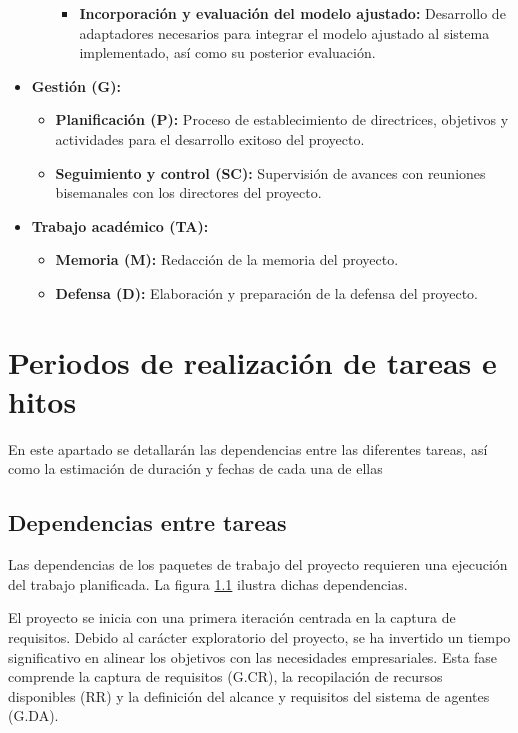 \begin{itemize}
\begin{itemize}
\begin{itemize}
          \item\textbf{Incorporación y evaluación del modelo ajustado: }Desarrollo de adaptadores necesarios para integrar el modelo ajustado al sistema implementado, así como su posterior evaluación.
        \end{itemize}
    \end{itemize}
  \item\textbf{Gestión (G): }
    \begin{itemize}
      \item\textbf{Planificación (P): }Proceso de establecimiento de directrices, objetivos y actividades para el desarrollo exitoso del proyecto.
      \item\textbf{Seguimiento y control (SC): }Supervisión de avances con reuniones bisemanales con los directores del proyecto.
    \end{itemize}
  \item\textbf{Trabajo académico (TA): }
    \begin{itemize}
      \item\textbf{Memoria (M): }Redacción de la memoria del proyecto. 
      \item\textbf{Defensa (D): }Elaboración y preparación de la defensa del proyecto.
    \end{itemize}
\end{itemize}

\section{Periodos de realización de tareas e hitos}
En este apartado se detallarán las dependencias entre las diferentes tareas, así como la estimación de duración y fechas de cada una de ellas

\subsection{Dependencias entre tareas}
Las dependencias de los paquetes de trabajo del proyecto requieren una ejecución del trabajo planificada. La figura \ref{} ilustra dichas dependencias.


El proyecto se inicia con una primera iteración centrada en la captura de requisitos. Debido al carácter exploratorio del proyecto, se ha invertido un tiempo significativo en alinear los objetivos con las necesidades empresariales. Esta fase comprende la captura de requisitos (G.CR), la recopilación de recursos disponibles (RR) y la definición del alcance y requisitos del sistema de agentes (G.DA).

